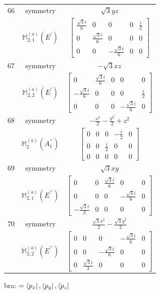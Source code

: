 \documentclass[fleqn,8pt,landscape]{jsarticle}
\begin{document}
\begin{longtable}{ccc}
$ 66 $ & $ \text{symmetry} $ & $ \sqrt{3} y z $ \\
$  $ & $ \mathbb{M}_{2,1}^{(a)}(E^{\prime}) $ & $ \begin{bmatrix} \frac{\sqrt{3} i}{6} & 0 & 0 & 0 & \frac{i}{2} \\ 0 & \frac{\sqrt{3} i}{6} & 0 & 0 & 0 \\ 0 & 0 & - \frac{\sqrt{3} i}{6} & 0 & 0 \end{bmatrix} $ \\ \hline
$ 67 $ & $ \text{symmetry} $ & $ - \sqrt{3} x z $ \\
$  $ & $ \mathbb{M}_{2,2}^{(a)}(E^{\prime}) $ & $ \begin{bmatrix} 0 & \frac{\sqrt{3} i}{6} & 0 & 0 & 0 \\ - \frac{\sqrt{3} i}{6} & 0 & 0 & 0 & \frac{i}{2} \\ 0 & 0 & 0 & - \frac{\sqrt{3} i}{6} & 0 \end{bmatrix} $ \\ \hline
$ 68 $ & $ \text{symmetry} $ & $ - \frac{x^{2}}{2} - \frac{y^{2}}{2} + z^{2} $ \\
$  $ & $ \mathbb{M}_{2}^{(a)}(A_{1}^{\prime\prime}) $ & $ \begin{bmatrix} 0 & 0 & 0 & - \frac{i}{2} & 0 \\ 0 & 0 & \frac{i}{2} & 0 & 0 \\ 0 & 0 & 0 & 0 & 0 \end{bmatrix} $ \\ \hline
$ 69 $ & $ \text{symmetry} $ & $ \sqrt{3} x y $ \\
$  $ & $ \mathbb{M}_{2,1}^{(a)}(E^{\prime\prime}) $ & $ \begin{bmatrix} 0 & 0 & \frac{\sqrt{3} i}{6} & 0 & 0 \\ 0 & 0 & 0 & - \frac{\sqrt{3} i}{6} & 0 \\ - \frac{\sqrt{3} i}{3} & 0 & 0 & 0 & 0 \end{bmatrix} $ \\ \hline
$ 70 $ & $ \text{symmetry} $ & $ \frac{\sqrt{3} x^{2}}{2} - \frac{\sqrt{3} y^{2}}{2} $ \\
$  $ & $ \mathbb{M}_{2,2}^{(a)}(E^{\prime\prime}) $ & $ \begin{bmatrix} 0 & 0 & 0 & - \frac{\sqrt{3} i}{6} & 0 \\ 0 & 0 & - \frac{\sqrt{3} i}{6} & 0 & 0 \\ 0 & \frac{\sqrt{3} i}{3} & 0 & 0 & 0 \end{bmatrix} $ \\ \hline
\end{longtable}
bra: $=\bra{p_{x}}, \bra{p_{y}}, \bra{p_{z}}$
\end{document}
